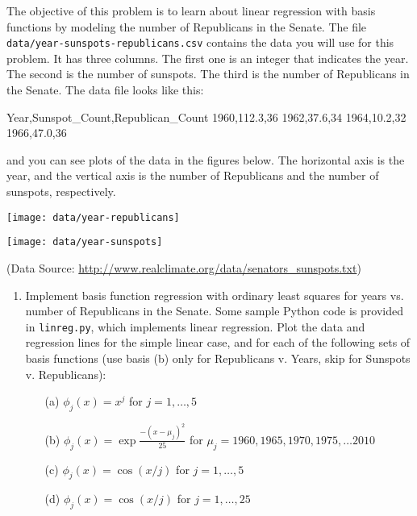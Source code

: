 \documentclass[submit]{harvardml}
\begin{document}
\begin{problem}
  
 The objective of this problem is to learn about linear regression
 with basis functions by modeling the number of Republicans in the
 Senate. The file \verb|data/year-sunspots-republicans.csv| contains the
 data you will use for this problem.  It has three columns.  The first
 one is an integer that indicates the year.  The second is the number
 of sunspots.  The third is the number of Republicans in the Senate.
 The data file looks like this:
 \begin{csv}
Year,Sunspot_Count,Republican_Count
1960,112.3,36
1962,37.6,34
1964,10.2,32
1966,47.0,36
\end{csv}
and you can see plots of the data in the figures below.  The horizontal axis is the year, and the vertical axis is the number of Republicans and the number of sunspots, respectively.

\begin{center}
\texttt{[image: data/year-republicans]}
\end{center}

\begin{center}
\texttt{[image: data/year-sunspots]}
\end{center}

(Data Source: \url{http://www.realclimate.org/data/senators_sunspots.txt})\\

\begin{enumerate}

\item Implement basis function regression with ordinary least squares for
years vs. number of Republicans in the Senate. Some sample Python code
is provided in \verb|linreg.py|, which implements linear regression.
Plot the data and regression lines for the simple linear case, and for
each of the following sets of basis functions (use basis (b) only for Republicans v. Years, skip for Sunspots v. Republicans):
\begin{enumerate}
	\item[(a)] $\phi_j(x) = x^j$ for $j=1, \ldots, 5$ 
    \item[(b)] $\phi_j(x) = \exp{\frac{-(x-\mu_j)^2}{25}}$ for $\mu_j=1960, 1965, 1970, 1975, \ldots 2010$
	\item[(c)] $\phi_j(x) = \cos(x / j)$ for $j=1, \ldots, 5$
	\item[(d)] $\phi_j(x) = \cos(x / j)$ for $j=1, \ldots, 25$
\end{enumerate}


\end{enumerate}
\end{problem}
\end{document}
